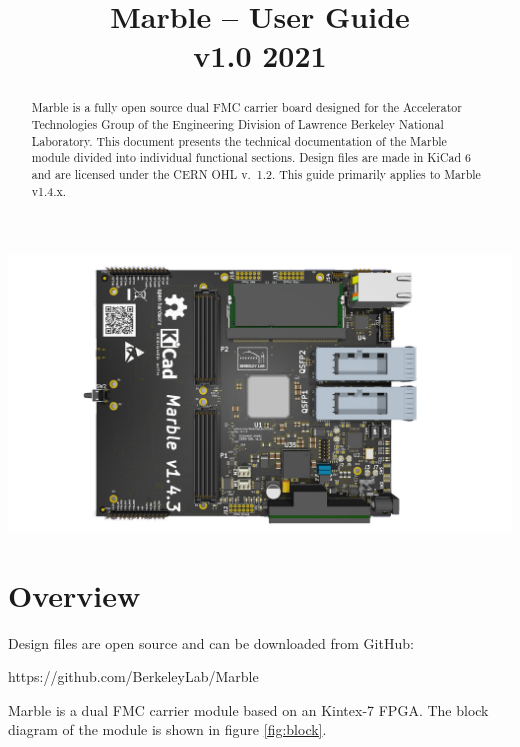 \documentclass[12pt,oneside,a4]{article}
\title{Marble -- User Guide\\ \small{v1.0 2021}}
\author{}
\begin{document}
\maketitle
\begin{center}
\includegraphics[width=0.8\linewidth]{marble_top.png}
\end{center}
\begin{abstract}
Marble is a fully open source dual FMC carrier board designed for the Accelerator Technologies Group of the Engineering Division of Lawrence Berkeley National Laboratory. This document presents the technical documentation of the Marble module divided into individual functional sections.
Design files are made in KiCad 6 and are licensed under the CERN OHL \hbox{v.~1.2}.
This guide primarily applies to Marble v1.4.x.
\end{abstract}

\clearpage
\tableofcontents

\clearpage

\section{Overview}

\begin{leftbar}
Design files are open source and can be downloaded from GitHub:

https://github.com/BerkeleyLab/Marble
\end{leftbar}

Marble is a dual FMC carrier module based on an Kintex-7 FPGA. The block diagram of the module is shown in figure \ref{fig:block}.
\end{document}
